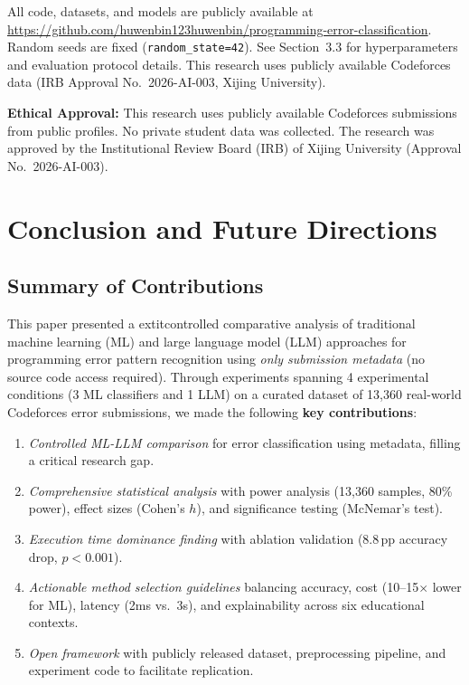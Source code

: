 \documentclass[acmsmall]{acmart}
\begin{document}
\begin{sloppypar}\raggedright
All code, datasets, and models are publicly available at
\url{https://github.com/huwenbin123huwenbin/programming-error-classification}. Random
seeds are fixed (\texttt{random\_state=42}). See Section~3.3 for
hyperparameters and evaluation protocol details. This research uses publicly
available Codeforces data (IRB Approval No.~2026-AI-003, Xijing University).
\end{sloppypar}

\textbf{Ethical Approval:} This research uses publicly available Codeforces
submissions from public profiles. No private student data was collected.
The research was approved by the Institutional Review Board (IRB) of
Xijing University (Approval No.~2026-AI-003).

\section{Conclusion and Future Directions}

\subsection*{Summary of Contributions}
This paper presented a 	extit{controlled comparative analysis} of
traditional machine learning (ML) and large language model (LLM) approaches
for programming error pattern recognition using \textit{only submission
metadata} (no source code access required). Through experiments spanning 4
experimental conditions (3 ML classifiers and 1 LLM) on a curated dataset of
13,360 real-world Codeforces error submissions, we made the following
\textbf{key contributions}:

\begin{enumerate}
    \item \textit{Controlled ML-LLM comparison} for error classification using
          metadata, filling a critical research gap.
    \item \textit{Comprehensive statistical analysis} with power analysis
          (13,360 samples, 80\% power), effect sizes (Cohen's $h$), and
          significance testing (McNemar's test).
    \item \textit{Execution time dominance finding} with ablation validation
          (8.8\,pp accuracy drop, $p < 0.001$).
    \item \textit{Actionable method selection guidelines} balancing accuracy,
          cost (10--15$\times$ lower for ML), latency (2ms vs.\ 3s), and
          explainability across six educational contexts.
    \item \textit{Open framework} with publicly released dataset, preprocessing
          pipeline, and experiment code to facilitate replication.
\end{enumerate}
\end{document}

